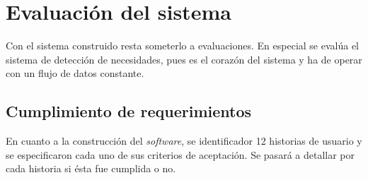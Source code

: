 \chapter{Evaluación del sistema}
\label{cap:experimentos}

Con el sistema construido resta someterlo a evaluaciones. En especial se evalúa el sistema de detección de necesidades, pues es el corazón del sistema y ha de operar con un flujo de datos constante.

\section{Cumplimiento de requerimientos}
\label{seC:cumpRequerimientos}

En cuanto a la construcción del \textit{software}, se identificador 12 historias de usuario y se especificaron cada uno de sus criterios de aceptación. Se pasará a detallar por cada historia si ésta fue cumplida o no.

